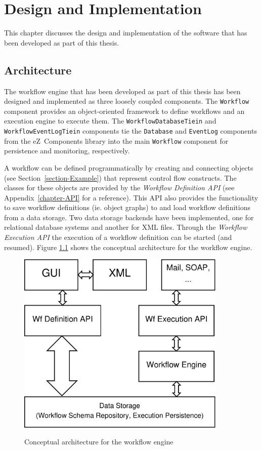 \chapter{Design and Implementation}
\label{chapter-DesignAndImplementation}

This chapter discusses the design and implementation of the software that has
been developed as part of this thesis.

\section{Architecture}
\label{section-Architecture}

The workflow engine that has been developed as part of this thesis has been
designed and implemented as three loosely coupled components. The
\texttt{Workflow} component provides an object-oriented framework to define
workflows and an execution engine to execute them.
The \texttt{WorkflowDatabaseTiein} and \texttt{WorkflowEventLogTiein}
components tie the \texttt{Database} and \texttt{EventLog} components from the
eZ~Components library into the main \texttt{Workflow} component for persistence
and monitoring, respectively.

A workflow can be defined programmatically by creating and connecting objects
(see Section~\ref{section-Example}) that represent control flow constructs.
The classes for these objects are provided by the \emph{Workflow Definition API}
(see Appendix~\ref{chapter-API} for a reference). This API also provides the
functionality to save workflow definitions (ie. object graphs) to and load
workflow definitions from a data storage. Two data storage backends have been
implemented, one for relational database systems and another for XML files.
Through the \emph{Workflow Execution API} the execution of a workflow
definition can be started (and resumed). Figure \ref{figure-architecture}
shows the conceptual architecture for the workflow engine.

\clearpage

\begin{figure}[hbt]
\begin{center}
\includegraphics[width=10cm]{figures/architecture}\\[5mm]
\end{center}
\caption{Conceptual architecture for the workflow engine}
\label{figure-architecture}
\end{figure}

